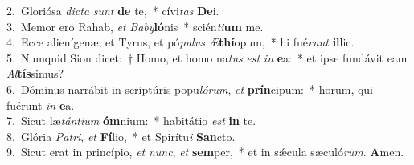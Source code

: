 {2.~}Gloriósa \textit{di}\textit{cta} \textit{sunt} \textbf{de} te,~* cívi\textit{tas} \textbf{De}i.\\
{3.~}Memor ero Rahab, \textit{et} \textit{Ba}\textit{by}\textbf{ló}nis~* scién\textit{ti}\textbf{um} me.\\
{4.~}Ecce alienígenæ, et Tyrus, et pó\textit{pu}\textit{lus} \textit{Æ}\textbf{thí}opum,~* hi fué\textit{runt} \textbf{il}lic.\\
{5.~}Numquid Sion dicet:~† Homo, et homo na\textit{tus} \textit{est} \textit{in} \textbf{e}a:~* et ipse fundávit eam \textit{Al}\textbf{tís}simus?\\
{6.~}Dóminus narrábit in scriptúris popu\textit{ló}\textit{rum}, \textit{et} \textbf{prín}cipum:~* horum, qui fuérunt \textit{in} \textbf{e}a.\\
{7.~}Sicut læ\textit{tán}\textit{ti}\textit{um} \textbf{óm}nium:~* habitátio \textit{est} \textbf{in} te.\\
{8.~}Glória \textit{Pa}\textit{tri}, \textit{et} \textbf{Fí}lio,~* et Spirítu\textit{i} \textbf{San}cto.\\
{9.~}Sicut erat in princípio, \textit{et} \textit{nunc}, \textit{et} \textbf{sem}per,~* et in sǽcula sæculó\textit{rum}. \textbf{A}men.\\
